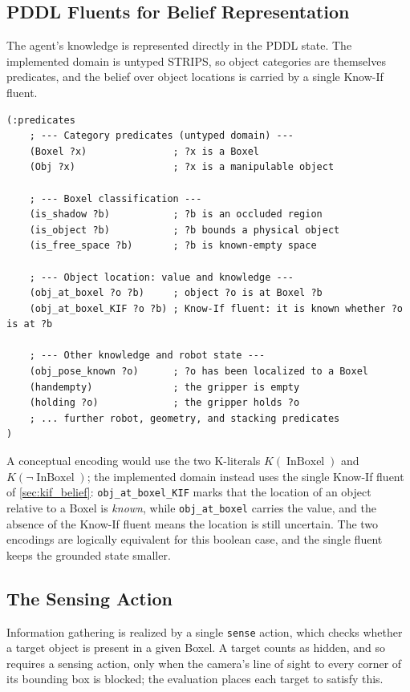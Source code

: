 \subsection{PDDL Fluents for Belief Representation}
The agent's knowledge is represented directly in the PDDL state. The implemented domain is untyped STRIPS, so object categories are themselves predicates, and the belief over object locations is carried by a single Know-If fluent.
\begin{lstlisting}[style=PDDL, caption=PDDL fluents for belief over Boxels, label=lst:pddl_fluents_k_literal]
(:predicates
    ; --- Category predicates (untyped domain) ---
    (Boxel ?x)               ; ?x is a Boxel
    (Obj ?x)                 ; ?x is a manipulable object

    ; --- Boxel classification ---
    (is_shadow ?b)           ; ?b is an occluded region
    (is_object ?b)           ; ?b bounds a physical object
    (is_free_space ?b)       ; ?b is known-empty space

    ; --- Object location: value and knowledge ---
    (obj_at_boxel ?o ?b)     ; object ?o is at Boxel ?b
    (obj_at_boxel_KIF ?o ?b) ; Know-If fluent: it is known whether ?o is at ?b

    ; --- Other knowledge and robot state ---
    (obj_pose_known ?o)      ; ?o has been localized to a Boxel
    (handempty)              ; the gripper is empty
    (holding ?o)             ; the gripper holds ?o
    ; ... further robot, geometry, and stacking predicates
)
\end{lstlisting}
A conceptual encoding would use the two K-literals $K(\operatorname{InBoxel})$ and $K(\neg\operatorname{InBoxel})$; the implemented domain instead uses the single Know-If fluent of \cref{sec:kif_belief}: \texttt{obj\_at\_boxel\_KIF} marks that the location of an object relative to a Boxel is \emph{known}, while \texttt{obj\_at\_boxel} carries the value, and the absence of the Know-If fluent means the location is still uncertain. The two encodings are logically equivalent for this boolean case, and the single fluent keeps the grounded state smaller.

\subsection{The Sensing Action}
Information gathering is realized by a single \texttt{sense} action, which checks whether a target object is present in a given Boxel. A target counts as hidden, and so requires a sensing action, only when the camera's line of sight to every corner of its bounding box is blocked; the evaluation places each target to satisfy this.

